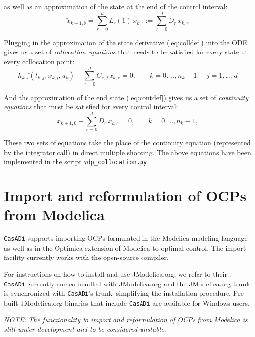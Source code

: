 \documentclass[a4paper,12pt]{book}
\newcommand{\CasADi}{\texttt{CasADi}\xspace}
\begin{document}
as well as an approximation of the state at the end of the control interval:
\begin{equation}
\tilde{x}_{k+1,0} = \sum_{r=0}^{d}{L_r(1) \, x_{k,r}} := \sum_{r=0}^{d}{D_r \, x_{k,r}}
\label{eq:contdef}
\end{equation}

Plugging in the approximation of the state derivative (\ref{eq:colldef}) into the ODE gives us a set of \emph{collocation equations} that needs to be satisfied for every state at every collocation point:
\begin{equation}
h_k \, f(t_{k,j},x_{k,j},u_k) - \sum_{r=0}^{d}{C_{r,j} \, x_{k,r}} = 0, \qquad k=0,\ldots,n_k-1, \quad j=1,\ldots,d
\end{equation}

And the approximation of the end state (\ref{eq:contdef}) gives us a set of \emph{continuity equations} that must be satisfied for every control interval:
\begin{equation}
x_{k+1,0} - \sum_{r=0}^{d}{D_r \, x_{k,r}} = 0, \qquad k=0,\ldots,n_k-1, 
\end{equation}

These two sets of equations take the place of the continuity equation (represented by the integrator call) in direct multiple shooting. The above equations have been implemented in the script \texttt{vdp\_collocation.py}.

\chapter{Import and reformulation of OCPs from Modelica} \label{ch:modelica}
\CasADi supports importing OCPs formulated in the Modelica modeling language as well as in the Optimica extension of Modelica to optimal control. The import facility currently works with the open-source  compiler.

For instructions on how to install and use JModelica.org, we refer to their . \CasADi currently comes bundled with JModelica.org and the JModelica.org trunk is synchronized with \CasADi's trunk, simplifying the installation procedure. Pre-built JModelica.org binaries that include \CasADi are available for Windows users.

\emph{NOTE: The functionality to import and reformulation of OCPs from Modelica is still under development and to be considered unstable.}
\end{document}
